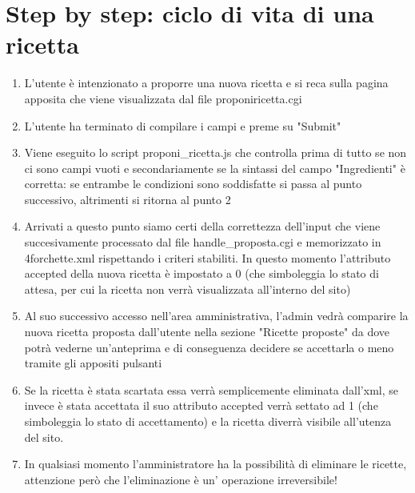 \documentclass[12pt]{article}
\begin{document}
	\section{Step by step: ciclo di vita di una ricetta}
			
\begin{enumerate}
\item L'utente \`e intenzionato a proporre una nuova ricetta e si reca sulla pagina apposita che viene visualizzata dal file proponiricetta.cgi
\item L'utente ha terminato di compilare i campi e preme su "Submit"
\item Viene eseguito lo script proponi\_ricetta.js che controlla prima di tutto se non ci sono campi vuoti e secondariamente se la sintassi del campo "Ingredienti" \`e corretta: se entrambe le condizioni sono soddisfatte si passa al punto successivo, altrimenti si ritorna al punto 2
\item Arrivati a questo punto siamo certi della correttezza dell'input che viene succesivamente processato dal file handle\_proposta.cgi e memorizzato in 4forchette.xml rispettando i criteri stabiliti. In questo momento l'attributo accepted della nuova ricetta \`e impostato a 0 (che simboleggia lo stato di attesa, per cui la ricetta non verr\`a visualizzata all'interno del sito)
\item Al suo successivo accesso nell'area amministrativa, l'admin vedr\`a comparire la nuova ricetta proposta dall'utente nella sezione "Ricette proposte" da dove potr\`a  vederne un'anteprima e di conseguenza decidere se accettarla o meno tramite gli appositi pulsanti
\item Se la ricetta \`e stata scartata essa verr\`a semplicemente eliminata dall'xml, se invece \`e stata accettata il suo attributo accepted verr\`a settato ad 1 (che simboleggia lo stato di accettamento) e la ricetta diverr\`a visibile all'utenza del sito.
\item In qualsiasi momento l'amministratore ha la possibilità di eliminare le ricette, attenzione per\`o che l'eliminazione \`e un' operazione irreversibile!
\end{enumerate}
\newpage
\end{document}
